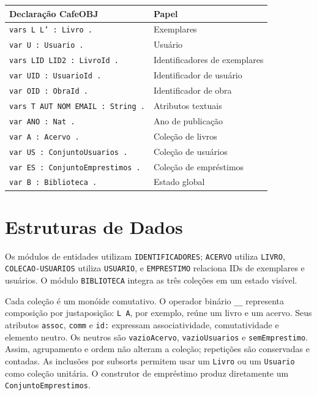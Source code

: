 \documentclass[a4paper,12pt]{article}
\begin{document}
\begin{center}
\small
\begin{tabular}{@{}ll@{}}
\toprule
Declaração CafeOBJ & Papel \\
\midrule
\texttt{vars L L' : Livro .} & Exemplares \\
\texttt{var U : Usuario .} & Usuário \\
\texttt{vars LID LID2 : LivroId .} & Identificadores de exemplares \\
\texttt{var UID : UsuarioId .} & Identificador de usuário \\
\texttt{var OID : ObraId .} & Identificador de obra \\
\texttt{vars T AUT NOM EMAIL : String .} & Atributos textuais \\
\texttt{var ANO : Nat .} & Ano de publicação \\
\texttt{var A : Acervo .} & Coleção de livros \\
\texttt{var US : ConjuntoUsuarios .} & Coleção de usuários \\
\texttt{var ES : ConjuntoEmprestimos .} & Coleção de empréstimos \\
\texttt{var B : Biblioteca .} & Estado global \\
\bottomrule
\end{tabular}
\end{center}

\section{Estruturas de Dados}

Os módulos de entidades utilizam \texttt{IDENTIFICADORES}; \texttt{ACERVO}
utiliza \texttt{LIVRO}, \texttt{COLECAO-USUARIOS} utiliza \texttt{USUARIO}, e
\texttt{EMPRESTIMO} relaciona IDs de exemplares e usuários. O módulo
\texttt{BIBLIOTECA} integra as três coleções em um estado visível.

Cada coleção é um monóide comutativo. O operador binário \texttt{\_\_}
representa composição por justaposição: \texttt{L A}, por exemplo, reúne um
livro e um acervo. Seus atributos \texttt{assoc}, \texttt{comm} e \texttt{id:}
expressam associatividade, comutatividade e elemento neutro. Os neutros são
\texttt{vazioAcervo}, \texttt{vazioUsuarios} e \texttt{semEmprestimo}.
Assim, agrupamento e ordem não alteram a coleção; repetições são conservadas
e contadas. As inclusões por subsorts permitem usar um \texttt{Livro} ou um
\texttt{Usuario} como coleção unitária. O construtor de empréstimo produz
diretamente um \texttt{ConjuntoEmprestimos}.
\end{document}
